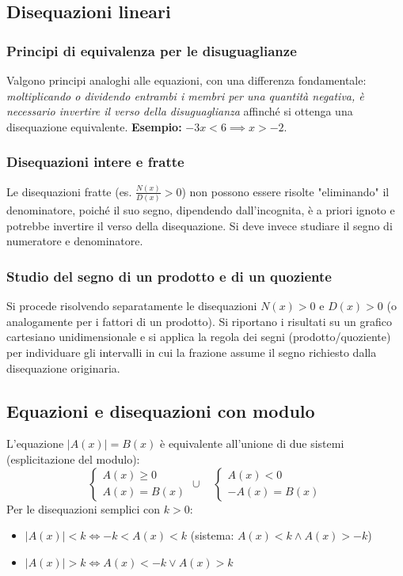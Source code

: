 \subsection{Disequazioni lineari}
\subsubsection{Principi di equivalenza per le disuguaglianze}
Valgono principi analoghi alle equazioni, con una differenza fondamentale: \textit{moltiplicando o dividendo entrambi i membri per una quantità negativa, è necessario invertire il verso della disuguaglianza} affinché si ottenga una disequazione equivalente.
\textbf{Esempio:} $-3x < 6 \implies x > -2$.

\subsubsection{Disequazioni intere e fratte}
Le disequazioni fratte (es. $\frac{N(x)}{D(x)} > 0$) non possono essere risolte "eliminando" il denominatore, poiché il suo segno, dipendendo dall'incognita, è a priori ignoto e potrebbe invertire il verso della disequazione. Si deve invece studiare il segno di numeratore e denominatore.

\subsubsection{Studio del segno di un prodotto e di un quoziente}
Si procede risolvendo separatamente le disequazioni $N(x) > 0$ e $D(x) > 0$ (o analogamente per i fattori di un prodotto). Si riportano i risultati su un grafico cartesiano unidimensionale e si applica la regola dei segni (prodotto/quoziente) per individuare gli intervalli in cui la frazione assume il segno richiesto dalla disequazione originaria.

\subsection{Equazioni e disequazioni con modulo}
L'equazione $|A(x)| = B(x)$ è equivalente all'unione di due sistemi (esplicitazione del modulo):
\[
\begin{cases} A(x) \ge 0 \\ A(x) = B(x) \end{cases} \cup \quad \begin{cases} A(x) < 0 \\ -A(x) = B(x) \end{cases}
\]
Per le disequazioni semplici con $k > 0$:
\begin{itemize}
    \item $|A(x)| < k \iff -k < A(x) < k$ (sistema: $A(x) < k \land A(x) > -k$)
    \item $|A(x)| > k \iff A(x) < -k \lor A(x) > k$
\end{itemize}

